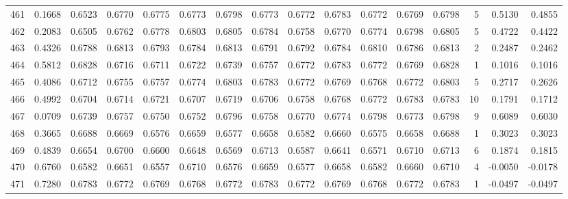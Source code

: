 \begin{tabular}{lrrrrrrrrrrrrrrr}
461 &      0.1668 &  0.6523 &  0.6770 &  0.6775 &  0.6773 &  0.6798 &  0.6773 &  0.6772 &  0.6783 &  0.6772 &   0.6769 &     0.6798 &      5 &                    0.5130 &                     0.4855 \\
462 &      0.2083 &  0.6505 &  0.6762 &  0.6778 &  0.6803 &  0.6805 &  0.6784 &  0.6758 &  0.6770 &  0.6774 &   0.6798 &     0.6805 &      5 &                    0.4722 &                     0.4422 \\
463 &      0.4326 &  0.6788 &  0.6813 &  0.6793 &  0.6784 &  0.6813 &  0.6791 &  0.6792 &  0.6784 &  0.6810 &   0.6786 &     0.6813 &      2 &                    0.2487 &                     0.2462 \\
464 &      0.5812 &  0.6828 &  0.6716 &  0.6711 &  0.6722 &  0.6739 &  0.6757 &  0.6772 &  0.6783 &  0.6772 &   0.6769 &     0.6828 &      1 &                    0.1016 &                     0.1016 \\
465 &      0.4086 &  0.6712 &  0.6755 &  0.6757 &  0.6774 &  0.6803 &  0.6783 &  0.6772 &  0.6769 &  0.6768 &   0.6772 &     0.6803 &      5 &                    0.2717 &                     0.2626 \\
466 &      0.4992 &  0.6704 &  0.6714 &  0.6721 &  0.6707 &  0.6719 &  0.6706 &  0.6758 &  0.6768 &  0.6772 &   0.6783 &     0.6783 &     10 &                    0.1791 &                     0.1712 \\
467 &      0.0709 &  0.6739 &  0.6757 &  0.6750 &  0.6752 &  0.6796 &  0.6758 &  0.6770 &  0.6774 &  0.6798 &   0.6773 &     0.6798 &      9 &                    0.6089 &                     0.6030 \\
468 &      0.3665 &  0.6688 &  0.6669 &  0.6576 &  0.6659 &  0.6577 &  0.6658 &  0.6582 &  0.6660 &  0.6575 &   0.6658 &     0.6688 &      1 &                    0.3023 &                     0.3023 \\
469 &      0.4839 &  0.6654 &  0.6700 &  0.6600 &  0.6648 &  0.6569 &  0.6713 &  0.6587 &  0.6641 &  0.6571 &   0.6710 &     0.6713 &      6 &                    0.1874 &                     0.1815 \\
470 &      0.6760 &  0.6582 &  0.6651 &  0.6557 &  0.6710 &  0.6576 &  0.6659 &  0.6577 &  0.6658 &  0.6582 &   0.6660 &     0.6710 &      4 &                   -0.0050 &                    -0.0178 \\
471 &      0.7280 &  0.6783 &  0.6772 &  0.6769 &  0.6768 &  0.6772 &  0.6783 &  0.6772 &  0.6769 &  0.6768 &   0.6772 &     0.6783 &      1 &                   -0.0497 &                    -0.0497 \\

\end{tabular}
